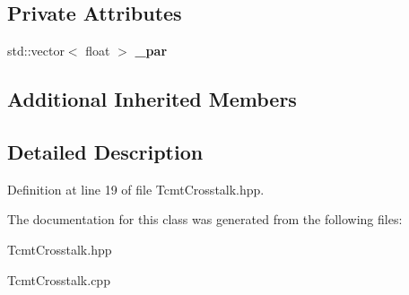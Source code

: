 \subsection*{Private Attributes}
\begin{DoxyCompactItemize}
\item 
std\-::vector$<$ float $>$ {\bfseries \-\_\-par}\label{classdigisim_1_1TcmtCrosstalk_ad2c79f9d6a2f613133a7ac6aa29c74e4}

\end{DoxyCompactItemize}
\subsection*{Additional Inherited Members}


\subsection{Detailed Description}


Definition at line 19 of file Tcmt\-Crosstalk.\-hpp.



The documentation for this class was generated from the following files\-:\begin{DoxyCompactItemize}
\item 
Tcmt\-Crosstalk.\-hpp\item 
Tcmt\-Crosstalk.\-cpp\end{DoxyCompactItemize}
